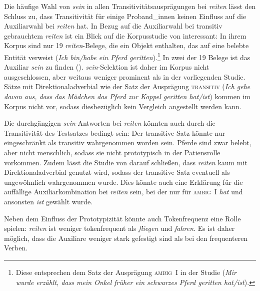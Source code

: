 Die häufige Wahl von \textit{sein} in allen Transitivitätsausprägungen bei \textit{reiten} lässt den Schluss zu, dass Transitivität für einige Proband\_innen keinen Einfluss auf die Auxiliarwahl bei \textit{reiten} hat. In Bezug auf die Auxiliarwahl bei transitiv gebrauchtem \textit{reiten} ist ein Blick auf die Korpusstudie von \textcite{Gillmann.2016} interessant: In ihrem Korpus sind nur 19 \textit{reiten}-Belege, die ein Objekt enthalten, das auf eine belebte Entität verweist (\textit{Ich bin/habe ein Pferd geritten}).\footnote{Diese entsprechen dem Satz der Ausprägung \textsc{ambig~I} in der Studie (\textit{Mir wurde erzählt, dass mein Onkel früher ein schwarzes Pferd geritten hat/ist}).} In zwei der 19 Belege ist das Auxiliar \textit{sein} zu finden (\cite[282--283]{Gillmann.2016}). \textit{sein}-Selektion ist daher im Korpus nicht ausgeschlossen, aber weitaus weniger prominent als in der vorliegenden Studie. Sätze mit Direktionaladverbial wie der Satz der Ausprägung \textsc{transitiv} (\textit{Ich gehe davon aus, dass das Mädchen das Pferd zur Koppel geritten hat/ist}) kommen im Korpus nicht vor, sodass diesbezüglich kein Vergleich angestellt werden kann. 


Die durchgängigen \textit{sein}-Antworten bei \textit{reiten} könnten auch durch die Transitivität des Testsatzes bedingt sein: Der transitive Satz könnte nur eingeschränkt als transitiv wahrgenommen worden sein. Pferde sind zwar belebt, aber nicht menschlich, sodass sie nicht prototypisch in der Patiensrolle vorkommen. Zudem lässt die Studie von \textcite{Gillmann.2016} darauf schließen, dass \textit{reiten} kaum mit Direktionaladverbial genutzt wird, sodass der transitive Satz eventuell als ungewöhnlich wahrgenommen wurde. Dies könnte auch eine Erklärung für die auffällige Auxiliarkombination bei \textit{reiten} sein, bei der nur für \textsc{ambig~I} \textit{hat} und ansonsten \textit{ist} gewählt wurde. 


Neben dem Einfluss der Prototypizität könnte auch Tokenfrequenz eine Rolle spielen: \textit{reiten} ist weniger tokenfrequent als \textit{fliegen} und \textit{fahren}. Es ist daher möglich, dass die Auxiliare weniger stark gefestigt sind als bei den frequenteren Verben.

